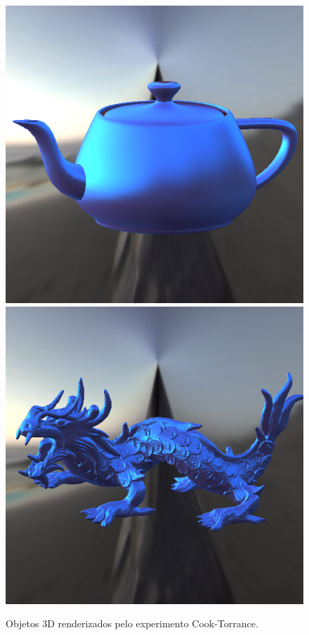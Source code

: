 \begin{figure}[H]
    \caption{\small{Objetos 3D renderizados pelo experimento Cook-Torrance.}}
    \label{fig-cook-torrance-eqlang}
  \includegraphics[width=\linewidth]{./Imagens/brdfs/cook-torrance-teapot.png}
\endminipage\hfill
{}
  \includegraphics[width=\linewidth]{./Imagens/brdfs/cook-torrance-dragon.png}

\end{figure}
